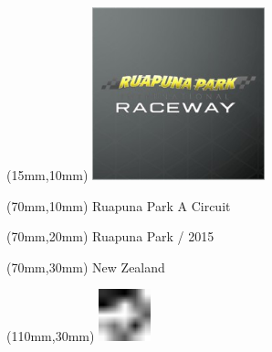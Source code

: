 \null\newpage
\begin{textblock*}{50mm}(15mm,10mm)%
\includegraphics[width=50mm]{LG/RUPU.png}
\end{textblock*}
\begin{textblock*}{130mm}(70mm,10mm)%
{\fontsize{20}{20}\selectfont Ruapuna Park A Circuit}\\
\end{textblock*}
\begin{textblock*}{120mm}(70mm,20mm)%
{\fontsize{16}{16}\selectfont Ruapuna Park / 2015}\\
\end{textblock*}
\begin{textblock*}{120mm}(70mm,30mm)%
{\fontsize{12}{12}\selectfont New Zealand}
\end{textblock*}
\begin{textblock*}{30mm}(110mm,30mm)%
\centering
\includegraphics[height=15mm]{icons/fa-rotate-left.pdf}
\end{textblock*}
